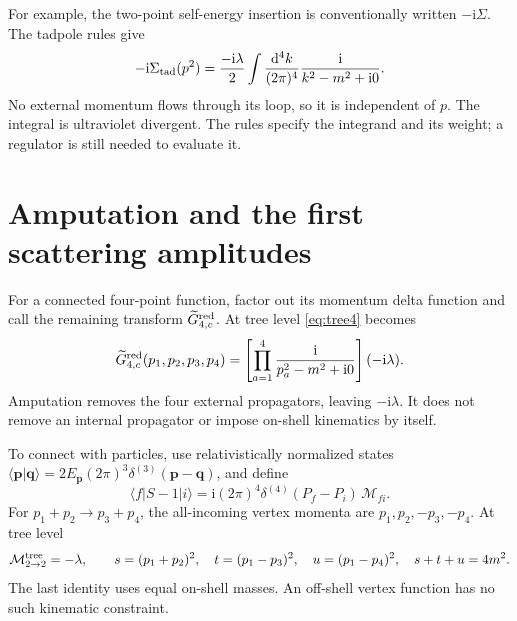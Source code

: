 \documentclass[11pt]{article}
\newcommand{\dd}{\mathrm d}
\newcommand{\ii}{\mathrm i}
\newcommand{\module}[1]{\clearpage\section{#1}}
\begin{document}
For example, the two-point self-energy insertion is conventionally
written \(-\ii\Sigma\). The tadpole rules give
\begin{equation}
 -\ii\Sigma_{\rm tad}(p^2)
 =\frac{-\ii\lambda}{2}\int\frac{\dd^4k}{(2\pi)^4}
 \frac{\ii}{k^2-m^2+\ii0}.                         \label{eq:sigma}
\end{equation}
No external momentum flows through its loop, so it is independent of
\(p\). The integral is ultraviolet divergent. The rules specify the
integrand and its weight; a regulator is still needed to evaluate it.

\module{Amputation and the first scattering amplitudes}
For a connected four-point function, factor out its momentum delta
function and call the remaining transform \(\widetilde G_{4,c}^{\rm red}\).
At tree level \eqref{eq:tree4} becomes
\begin{equation}
 \widetilde G_{4,c}^{\rm red}(p_1,p_2,p_3,p_4)
 =\left[\prod_{a=1}^4\frac{\ii}{p_a^2-m^2+\ii0}\right](-\ii\lambda).
 \label{eq:amputate}
\end{equation}
Amputation removes the four external propagators, leaving
\(-\ii\lambda\). It does not remove an internal propagator or impose
on-shell kinematics by itself.

To connect with particles, use relativistically normalized states
\(\langle\bm p|\bm q\rangle=2E_{\bm p}(2\pi)^3
\delta^{(3)}(\bm p-\bm q)\), and define
\begin{equation}
 \langle f|S-1|i\rangle
 =\ii(2\pi)^4\delta^{(4)}(P_f-P_i)\,\mathcal M_{fi}.
 \label{eq:Smatrix}
\end{equation}
For \(p_1+p_2\to p_3+p_4\), the all-incoming vertex momenta are
\(p_1,p_2,-p_3,-p_4\). At tree level
\begin{equation}
 \mathcal M_{2\to2}^{\rm tree}=-\lambda,\qquad
 s=(p_1+p_2)^2,\quad t=(p_1-p_3)^2,\quad u=(p_1-p_4)^2,
 \quad s+t+u=4m^2.
\end{equation}
The last identity uses equal on-shell masses. An off-shell vertex
function has no such kinematic constraint.
\end{document}
